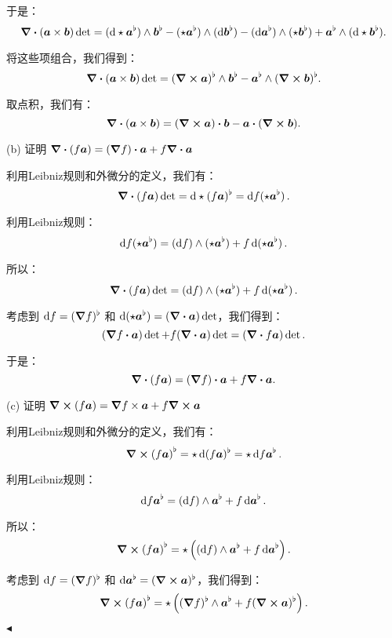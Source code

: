 \documentclass[11pt]{article}
\newenvironment{question}[2][Question]{\begin{trivlist}
\item[\hskip \labelsep {\bfseries #1}\hskip \labelsep {\bfseries #2.}]}{\hfill$\blacktriangleleft$\end{trivlist}}
\begin{document}
\begin{question}{5 (16') (外微分)}
    于是：
    \[
    \div (\vb*{a} \times \vb*{b}) \det = (\dd{\star \vb*{a}^\flat}) \wedge \vb*{b}^\flat - (\star \vb*{a}^\flat) \wedge (\dd{\vb*{b}^\flat}) - (\dd{\vb*{a}^\flat}) \wedge (\star \vb*{b}^\flat) + \vb*{a}^\flat \wedge (\dd{\star \vb*{b}^\flat}).
    \]
    
    将这些项组合，我们得到：
    \[
    \div (\vb*{a} \times \vb*{b}) \det = (\curl \vb*{a})^\flat \wedge \vb*{b}^\flat - \vb*{a}^\flat \wedge (\curl \vb*{b})^\flat.
    \]
    
    取点积，我们有：
    \[
    \div (\vb*{a} \times \vb*{b}) = (\curl \vb*{a}) \vdot \vb*{b} - \vb*{a} \vdot (\curl \vb*{b}).
    \]
    
     (b) 证明 \(\div(f \vb*{a}) = (\grad f) \vdot \vb*{a} + f \div{\vb*{a}}\)
    
    利用Leibniz规则和外微分的定义，我们有：
    \[
    \div(f \vb*{a}) \det = \dd{\star (f \vb*{a})^\flat} = \dd{f (\star \vb*{a}^\flat)}.
    \]
    
    利用Leibniz规则：
    \[
    \dd{f (\star \vb*{a}^\flat)} = (\dd{f}) \wedge (\star \vb*{a}^\flat) + f \dd{(\star \vb*{a}^\flat)}.
    \]
    
    所以：
    \[
    \div(f \vb*{a}) \det = (\dd{f}) \wedge (\star \vb*{a}^\flat) + f \dd{(\star \vb*{a}^\flat)}.
    \]
    
    考虑到 \(\dd{f} = (\grad f)^\flat\) 和 \(\dd{(\star \vb*{a}^\flat)} = (\div \vb*{a}) \det\)，我们得到：
    \[
    (\grad f \vdot \vb*{a}) \det + f (\div \vb*{a}) \det = (\div f \vb*{a}) \det.
    \]
    
    于是：
    \[
    \div (f \vb*{a}) = (\grad f) \vdot \vb*{a} + f \div \vb*{a}.
    \]
    
     (c) 证明 \(\curl(f \vb*{a}) = \grad f \times \vb*{a} + f \curl{\vb*{a}}\)
    
    利用Leibniz规则和外微分的定义，我们有：
    \[
    \curl(f \vb*{a})^\flat = \star \dd{(f \vb*{a})^\flat} = \star \dd{f \vb*{a}^\flat}.
    \]
    
    利用Leibniz规则：
    \[
    \dd{f \vb*{a}^\flat} = (\dd{f}) \wedge \vb*{a}^\flat + f \dd{\vb*{a}^\flat}.
    \]
    
    所以：
    \[
    \curl(f \vb*{a})^\flat = \star \left( (\dd{f}) \wedge \vb*{a}^\flat + f \dd{\vb*{a}^\flat} \right).
    \]
    
    考虑到 \(\dd{f} = (\grad f)^\flat\) 和 \(\dd{\vb*{a}^\flat} = (\curl \vb*{a})^\flat\)，我们得到：
    \[
    \curl(f \vb*{a})^\flat = \star \left( (\grad f)^\flat \wedge \vb*{a}^\flat + f (\curl \vb*{a})^\flat \right).
    \]
    

\end{question}
\end{document}
